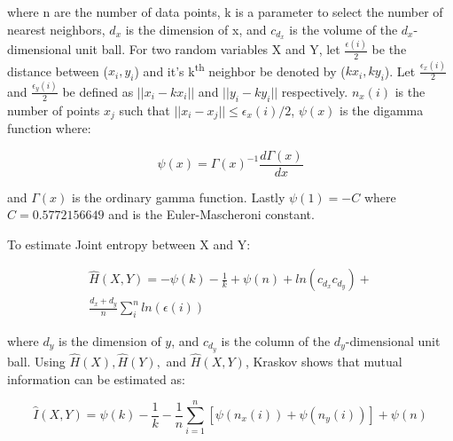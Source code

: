\noindent where n are the number of data points, k is a parameter to select the number of nearest neighbors,  \(d_x\) is the dimension of x, and \(c_{d_x}\) is the volume of the \(d_x\)-dimensional unit ball. For two random variables X and Y, let \( \frac{\epsilon(i)}{2} \) be the distance between (\(x_i,y_i\)) and it's k\textsuperscript{th} neighbor be denoted by (\(kx_i,ky_i\)). Let \(\frac{\epsilon_x(i)}{2}\) and  \(\frac{\epsilon_y(i)}{2}\) be defined as \( ||x_i-kx_i ||\) and \( ||y_i-ky_i || \) respectively. \(n_x(i)\) is the number of points \(x_j\) such that \(||x_i - x_j  || \leq \epsilon_x(i)/2\), \(\psi(x)\) is the digamma function where:

\begin{equation}
\psi(x) = \Gamma(x)^{-1} \frac{d\Gamma(x)} {dx}
\end{equation}

\noindent and  \(\Gamma(x)\) is the ordinary gamma function. Lastly \(\psi(1) = -C\) where \(C=0.5772156649\) and is the Euler-Mascheroni constant. %

To estimate Joint entropy between X and Y: 

\setlength{\arraycolsep}{0.0em}
\begin{eqnarray}
\hat{H}(X,Y) = - \psi(k) - \frac{1}{k} + \psi(n) + ln(c_{d_x} c_{d_y})  +  \nonumber\\
\frac{d_x + d_y}{n} \sum^n_i ln(\epsilon(i))
\end{eqnarray}
\setlength{\arraycolsep}{1pt}


\noindent where \(d_y\) is the dimension of \(y\), and \(c_{d_y}\) is the column of the \(d_y\)-dimensional unit ball. Using \(\hat{H}(X), \hat{H}(Y),\) and \(\hat{H}(X,Y)\), Kraskov shows that mutual information can be estimated as:

\begin{equation}
\label{KraskovEquation}
\hat{I}(X,Y) = \psi(k) - \frac{1}{k} - \frac{1}{n}  \sum_{i=1}^n [\psi(n_x(i)) + \psi(n_y(i))] + \psi(n)
\end{equation}

